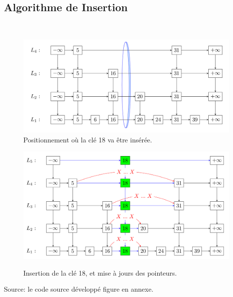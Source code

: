 \documentclass{beamer}
\begin{document}
\subsection{Algorithme de Insertion}
{
	\begin{frame}	
		~\\[-0.8cm]
		\begin{figure}
			\centering
			\includegraphics[height=0.35\textheight]{insert1.png}\\[-.4cm]
			\caption{Positionnement où la clé 18 va être insérée.} 
			\includegraphics[height=0.38\textheight]{insert2.png}\\[-.4cm]
			\caption{Insertion de la clé 18, et mise à jours des pointeurs.}
		\end{figure}
	\centering
	{\footnotesize {Source: le code source développé figure en annexe.}}

	\end{frame}
}

\end{document}
